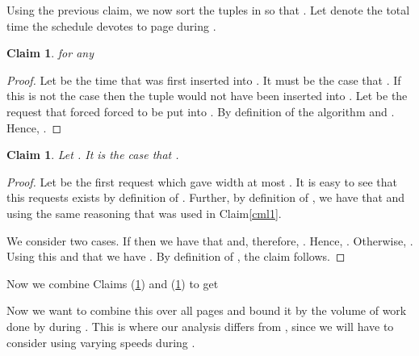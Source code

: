 \documentclass[11pt]{article}
\newtheorem{claim}[lemma]{Claim}
\begin{document}
Using the previous claim, we now sort the tuples in  so that .  Let  denote the total time the schedule  devotes to page  during . 










\begin{claim}\label{clm2}
 for any 
\end{claim}
\begin{proof}
Let  be the time that  was first inserted into .  It must be the case that .  If this is not the case then the tuple  would not have been inserted into .  Let  be the request that forced forced  to be put into .  By definition of the algorithm  and .  Hence, .
\end{proof}


\begin{claim}\label{clm3}
Let .  It is the case that .
\end{claim}
\begin{proof}
Let  be the first request which gave  width at most .  It is easy to see that this requests exists by definition of .  Further, by definition of , we have that  and  using the same reasoning that was used in Claim\ref{cml1}.  

We consider two cases.  If  then we have that  and, therefore, .  Hence, .  Otherwise, .  Using this and that  we have .  By definition of , the claim follows.
\end{proof}

Now we combine Claims (\ref{clm2}) and (\ref{clm3}) to get



Now we want to combine this over all pages and bound it by the volume of work done by  during .  This is where our analysis differs from \cite{BansalKN09}, since we will have to consider  using varying speeds during .

\fi
\end{document}
